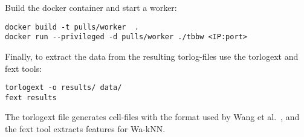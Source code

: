 Build the docker container and start a worker:

\begin{lstlisting}
docker build -t pulls/worker  .
docker run --privileged -d pulls/worker ./tbbw <IP:port>
\end{lstlisting}

Finally, to extract the data from the resulting torlog-files use the
torlogext and fext tools:

\begin{lstlisting}
torlogext -o results/ data/
fext results
\end{lstlisting}
The torlogext file generates cell-files with the format used by
Wang et al.~\cite{Wang2014a}, and the fext tool extracts features for Wa-kNN.
